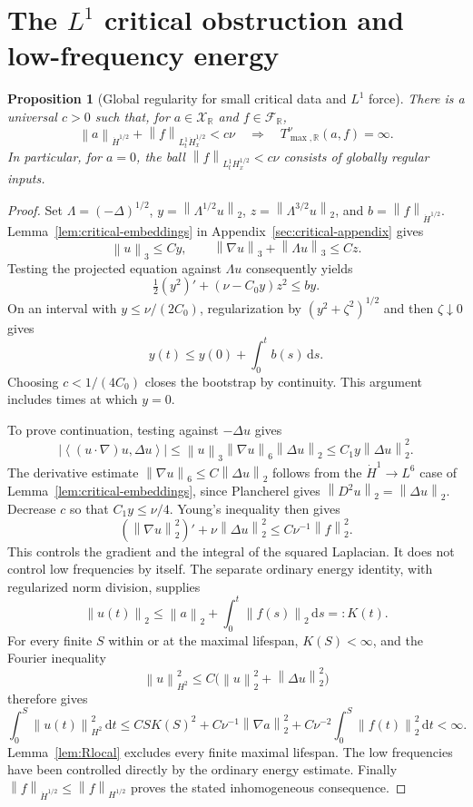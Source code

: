 \documentclass[11pt,a4paper]{article}
\newtheorem{proposition}[theorem]{Proposition}
\theoremstyle{definition}\newtheorem{definition}[theorem]{Definition}
\theoremstyle{remark}\newtheorem{remark}[theorem]{Remark}
\newcommand{\R}{\mathbb R}\newcommand{\TT}{\mathbb T^3}
\newcommand{\dd}{\,\mathrm d}\newcommand{\eps}{\varepsilon}
\newcommand{\norm}[1]{\left\lVert#1\right\rVert}
\newcommand{\ip}[2]{\left\langle#1,#2\right\rangle}
\begin{document}
\section{The \texorpdfstring{$L^1$}{L1} critical obstruction and low-frequency energy}
\begin{proposition}[Global regularity for small critical data and $L^1$ force]\label{prop:Rcritical1}
There is a universal $c>0$ such that, for $a\in\mathcal X_{\R}$ and $f\in\mathcal F_{\R}$,
\[
 \norm{a}_{\dot H^{1/2}}+\norm{f}_{L^1_t\dot H^{1/2}_x}<c\nu
 \quad\Longrightarrow\quad T^\nu_{\max,\R}(a,f)=\infty.
\]
In particular, for $a=0$, the ball $\norm{f}_{L^1_tH^{1/2}_x}<c\nu$ consists of globally regular inputs.
\end{proposition}
\begin{proof}
Set $\Lambda=(-\Delta)^{1/2}$, $y=\norm{\Lambda^{1/2}u}_2$, $z=\norm{\Lambda^{3/2}u}_2$, and $b=\norm{f}_{\dot H^{1/2}}$. Lemma~\ref{lem:critical-embeddings} in Appendix~\ref{sec:critical-appendix} gives
\[
 \norm{u}_3\le Cy,\qquad
 \norm{\nabla u}_3+\norm{\Lambda u}_3\le Cz.
\]
Testing the projected equation against $\Lambda u$ consequently yields
\begin{equation}\label{eq:Rcritical1}
 \tfrac12(y^2)'+(\nu-C_0y)z^2\le by.
\end{equation}
On an interval with $y\le\nu/(2C_0)$, regularization by $(y^2+\zeta^2)^{1/2}$ and then $\zeta\downarrow0$ gives
\[
 y(t)\le y(0)+\int_0^tb(s)\dd s.
\]
Choosing $c<1/(4C_0)$ closes the bootstrap by continuity. This argument includes times at which $y=0$.

To prove continuation, testing against $-\Delta u$ gives
\[
 |\ip{(u\cdot\nabla)u}{\Delta u}|
 \le\norm{u}_3\norm{\nabla u}_6\norm{\Delta u}_2
 \le C_1y\norm{\Delta u}_2^2.
\]
The derivative estimate $\norm{\nabla u}_6\le C\norm{\Delta u}_2$ follows from the $\dot H^1\to L^6$ case of Lemma~\ref{lem:critical-embeddings}, since Plancherel gives $\norm{D^2u}_2=\norm{\Delta u}_2$. Decrease $c$ so that $C_1y\le\nu/4$. Young's inequality then gives
\begin{equation}\label{eq:RH1}
 (\norm{\nabla u}_2^2)'+\nu\norm{\Delta u}_2^2
 \le C\nu^{-1}\norm{f}_2^2.
\end{equation}
This controls the gradient and the integral of the squared Laplacian. It does not control low frequencies by itself. The separate ordinary energy identity, with regularized norm division, supplies
\begin{equation}\label{eq:RL2}
 \norm{u(t)}_2\le\norm{a}_2+\int_0^t\norm{f(s)}_2\dd s=:K(t).
\end{equation}
For every finite $S$ within or at the maximal lifespan, $K(S)<\infty$, and the Fourier inequality
\[
 \norm{u}_{H^2}^2\le C\bigl(\norm{u}_2^2+\norm{\Delta u}_2^2\bigr)
\]
therefore gives
\[
 \int_0^S\norm{u(t)}_{H^2}^2\dd t
 \le C S K(S)^2
  +C\nu^{-1}\norm{\nabla a}_2^2
  +C\nu^{-2}\int_0^S\norm{f(t)}_2^2\dd t<\infty.
\]
Lemma~\ref{lem:Rlocal} excludes every finite maximal lifespan. The low frequencies have been controlled directly by the ordinary energy estimate. Finally $\norm{f}_{\dot H^{1/2}}\le\norm{f}_{H^{1/2}}$ proves the stated inhomogeneous consequence.
\end{proof}
\end{document}
